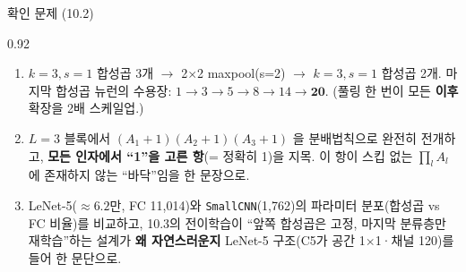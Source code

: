 \begin{frame}{확인 문제 (10.2)}
\begin{center}\begin{varwidth}{0.92\textwidth}
  \small
  \begin{enumerate}
    \item {} $k{=}3, s{=}1$ 합성곱 3개
      $\to$ 2$\times$2 maxpool(s=2) $\to$ $k{=}3, s{=}1$ 합성곱 2개.
      마지막 합성곱 뉴런의 수용장:
      $1 \to 3 \to 5 \to 8 \to 14 \to \mathbf{20}$.
      (풀링 한 번이 모든 \textbf{이후} 확장을 2배 스케일업.)
    \item {} $L=3$ 블록에서
      $(A_1+1)(A_2+1)(A_3+1)$ 을 분배법칙으로 완전히 전개하고,
      \textbf{모든 인자에서 ``1''을 고른 항}(= 정확히 1)을
      지목. 이 항이 스킵 없는 $\prod_l A_l$ 에 존재하지 않는
      ``바닥''임을 한 문장으로.
    \item {} LeNet-5($\approx 6.2$만, FC 11,014)와
      \texttt{SmallCNN}(1,762)의 파라미터 분포(합성곱 vs FC
      비율)를 비교하고, 10.3의 전이학습이 ``앞쪽 합성곱은
      고정, 마지막 분류층만 재학습''하는 설계가 \textbf{왜
      자연스러운지} LeNet-5 구조(C5가 공간 1$\times$1·채널 120)를
      들어 한 문단으로.
  \end{enumerate}
\end{varwidth}\end{center}
\end{frame}
